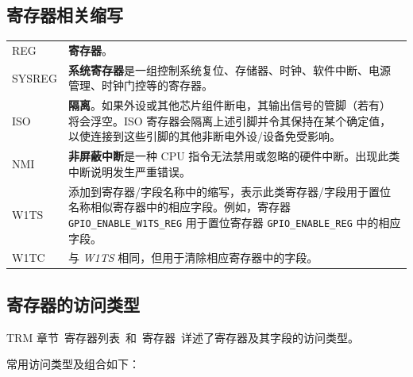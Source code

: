 
\subsection*{寄存器相关缩写}\label{glossary-abbr-reg}

\begin{longtable}[c]{ R{3cm} p{12cm} }

REG     & \textbf{寄存器}。 \\
SYSREG  & \textbf{系统寄存器}是一组控制系统复位、存储器、时钟、软件中断、电源管理、时钟门控等的寄存器。 \\
ISO     & \textbf{隔离}。如果外设或其他芯片组件断电，其输出信号的管脚（若有）将会浮空。ISO 寄存器会隔离上述引脚并令其保持在某个确定值，以使连接到这些引脚的其他非断电外设/设备免受影响。 \\
NMI     & \textbf{非屏蔽中断}是一种 CPU 指令无法禁用或忽略的硬件中断。出现此类中断说明发生严重错误。 \\
W1TS    & 添加到寄存器/字段名称中的缩写，表示此类寄存器/字段用于置位名称相似寄存器中的相应字段。例如，寄存器 \texttt{GPIO\_ENABLE\_W1TS\_REG} 用于置位寄存器 \texttt{GPIO\_ENABLE\_REG} 中的相应字段。 \\
W1TC    & 与 \textit{W1TS} 相同，但用于清除相应寄存器中的字段。 \\

\end{longtable}



\clearpage
{}
\subsection*{寄存器的访问类型}\label{glossary-access-types}

TRM 章节\ 寄存器列表\ 和\ 寄存器\ 详述了寄存器及其字段的访问类型。

常用访问类型及组合如下：

